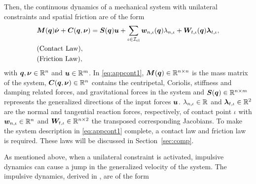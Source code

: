 \documentclass[../DC2019003Bouma.tex]{subfiles}
\begin{document}
Then, the continuous dynamics of a mechanical system with unilateral constraints and spatial friction are of the form
\begin{align}
&{\boldsymbol{M}}({\boldsymbol{q}})\dot{\boldsymbol{\nu}} + {\boldsymbol{C}}({\boldsymbol{q}},\boldsymbol{\nu}) = {\boldsymbol{S}}({\boldsymbol{q}}){\boldsymbol{u}} + \sum_{\iota\in\mathcal{I}_{\text{cl}}}{\boldsymbol{w}}_{n,\iota}({\boldsymbol{q}})\lambda_{n,\iota} + {\boldsymbol{W}}_{t,\iota}({\boldsymbol{q}})\boldsymbol{\lambda}_{t,\iota}, \label{eq:appcont1}\\
&\text{(Contact Law)},\nonumber\\
&\text{(Friction Law)},\nonumber
\end{align}
%
%
%
%
%
%
%
with ${\boldsymbol{q}},\boldsymbol{\nu}\in\mathbb{R}^{n}$ and ${\boldsymbol{u}}\in\mathbb{R}^m$. In \eqref{eq:appcont1}, ${\boldsymbol{M}}({\boldsymbol{q}})\in\mathbb{R}^{n\times n}$ is the mass matrix of the system, ${\boldsymbol{C}}({\boldsymbol{q}},\boldsymbol{\nu})\in\mathbb{R}^{n}$ contains the centripetal, Coriolis, stiffness and damping related forces, and gravitational forces in the system and ${\boldsymbol{S}}({\boldsymbol{q}})\in\mathbb{R}^{n\times m}$ represents the generalized directions of the input forces ${\boldsymbol{u}}$. $\lambda_{n,\iota}\in\mathbb{R}$ and $\boldsymbol{\lambda}_{t,\iota}\in\mathbb{R}^{2}$ are the normal and tangential reaction forces, respectively, of contact point $\iota$ with ${\boldsymbol{w}}_{n,\iota}\in\mathbb{R}^{n}$ and ${\boldsymbol{W}}_{t,\iota}\in\mathbb{R}^{n\times 2}$ the transposed corresponding Jacobians. To make the system description in \eqref{eq:appcont1} complete, a contact law and friction law is required. These laws will be discussed in Section~\ref{sec:comp}.

As mentioned above, when a unilateral constraint is activated, impulsive dynamics can cause a jump in the generalized velocity of the system. The impulsive dynamics, derived in \cite[Section 5.4]{Leine2008}, are of the form
\end{document}
